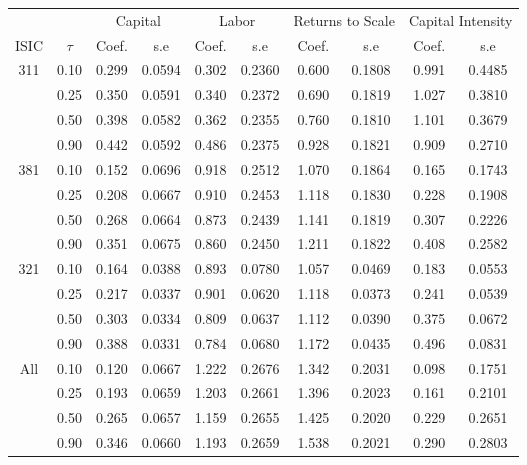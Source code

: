 \begin{table}[H]
\centering
\begin{tabular}{cccccccccc}
  \hline\hline & & \multicolumn{2}{c}{Capital}  & \multicolumn{2}{c}{Labor} & \multicolumn{2}{c}{Returns to Scale} & \multicolumn{2}{c}{Capital Intensity}\\ \cmidrule(lr){3-4} \cmidrule(lr){5-6} \cmidrule(lr){7-8} \cmidrule(lr){9-10}ISIC & $\tau$ & Coef. & s.e & Coef. & s.e & Coef. & s.e & Coef. & s.e \\ 
  \hline
311 & 0.10 & 0.299 & 0.0594 & 0.302 & 0.2360 & 0.600 & 0.1808 & 0.991 & 0.4485 \\ 
   & 0.25 & 0.350 & 0.0591 & 0.340 & 0.2372 & 0.690 & 0.1819 & 1.027 & 0.3810 \\ 
   & 0.50 & 0.398 & 0.0582 & 0.362 & 0.2355 & 0.760 & 0.1810 & 1.101 & 0.3679 \\ 
   & 0.90 & 0.442 & 0.0592 & 0.486 & 0.2375 & 0.928 & 0.1821 & 0.909 & 0.2710 \\ 
  381 & 0.10 & 0.152 & 0.0696 & 0.918 & 0.2512 & 1.070 & 0.1864 & 0.165 & 0.1743 \\ 
   & 0.25 & 0.208 & 0.0667 & 0.910 & 0.2453 & 1.118 & 0.1830 & 0.228 & 0.1908 \\ 
   & 0.50 & 0.268 & 0.0664 & 0.873 & 0.2439 & 1.141 & 0.1819 & 0.307 & 0.2226 \\ 
   & 0.90 & 0.351 & 0.0675 & 0.860 & 0.2450 & 1.211 & 0.1822 & 0.408 & 0.2582 \\ 
  321 & 0.10 & 0.164 & 0.0388 & 0.893 & 0.0780 & 1.057 & 0.0469 & 0.183 & 0.0553 \\ 
   & 0.25 & 0.217 & 0.0337 & 0.901 & 0.0620 & 1.118 & 0.0373 & 0.241 & 0.0539 \\ 
   & 0.50 & 0.303 & 0.0334 & 0.809 & 0.0637 & 1.112 & 0.0390 & 0.375 & 0.0672 \\ 
   & 0.90 & 0.388 & 0.0331 & 0.784 & 0.0680 & 1.172 & 0.0435 & 0.496 & 0.0831 \\ 
  All & 0.10 & 0.120 & 0.0667 & 1.222 & 0.2676 & 1.342 & 0.2031 & 0.098 & 0.1751 \\ 
   & 0.25 & 0.193 & 0.0659 & 1.203 & 0.2661 & 1.396 & 0.2023 & 0.161 & 0.2101 \\ 
   & 0.50 & 0.265 & 0.0657 & 1.159 & 0.2655 & 1.425 & 0.2020 & 0.229 & 0.2651 \\ 
   & 0.90 & 0.346 & 0.0660 & 1.193 & 0.2659 & 1.538 & 0.2021 & 0.290 & 0.2803 \\ 
   \hline
\end{tabular}
\end{table}
